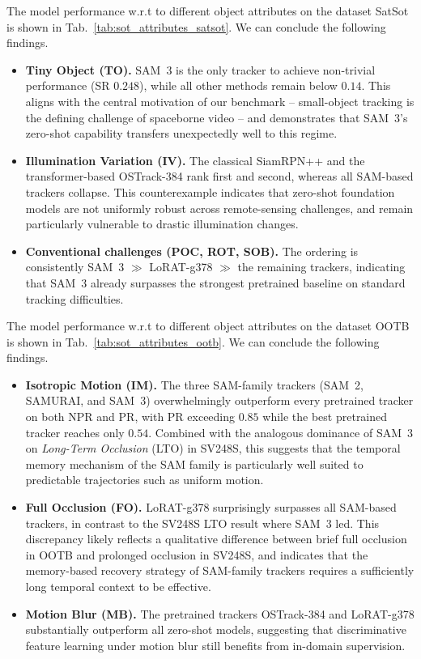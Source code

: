 \documentclass{article}
\begin{document}

The model performance w.r.t to different object attributes on the dataset SatSot
is shown in Tab.~\ref{tab:sot_attributes_satsot}. We can conclude the following
findings.
\begin{itemize}
    \item \textbf{Tiny Object (TO).} SAM~3 is the only tracker to achieve
    non-trivial performance (SR $0.248$), while all other methods remain
    below $0.14$. This aligns with the central motivation of our benchmark
    -- small-object tracking is the defining challenge of spaceborne
    video -- and demonstrates that SAM~3's zero-shot capability transfers
    unexpectedly well to this regime.
    \item \textbf{Illumination Variation (IV).} The classical
    SiamRPN++ and the transformer-based OSTrack-384 rank first and second,
    whereas all SAM-based trackers collapse. This counterexample indicates
    that zero-shot foundation models are not uniformly robust across
    remote-sensing challenges, and remain particularly vulnerable to
    drastic illumination changes.
    \item \textbf{Conventional challenges (POC, ROT, SOB).} The ordering
    is consistently SAM~3 $\gg$ LoRAT-g378 $\gg$ the remaining trackers,
    indicating that SAM~3 already surpasses the strongest pretrained
    baseline on standard tracking difficulties.
\end{itemize}
 
The model performance w.r.t to different object attributes on the dataset OOTB
is shown in Tab.~\ref{tab:sot_attributes_ootb}. We can conclude the following
findings.
\begin{itemize}
    \item \textbf{Isotropic Motion (IM).} The three SAM-family trackers
    (SAM~2, SAMURAI, and SAM~3) overwhelmingly outperform every pretrained
    tracker on both NPR and PR, with PR exceeding $0.85$ while the best
    pretrained tracker reaches only $0.54$. Combined with the analogous
    dominance of SAM~3 on \emph{Long-Term Occlusion} (LTO) in SV248S,
    this suggests that the temporal memory mechanism of the SAM family
    is particularly well suited to predictable trajectories such as
    uniform motion.
    \item \textbf{Full Occlusion (FO).} LoRAT-g378 surprisingly
    surpasses all SAM-based trackers, in contrast to the SV248S LTO
    result where SAM~3 led. This discrepancy likely reflects a
    qualitative difference between brief full occlusion in OOTB and
    prolonged occlusion in SV248S, and indicates that the memory-based
    recovery strategy of SAM-family trackers requires a sufficiently
    long temporal context to be effective.
    \item \textbf{Motion Blur (MB).} The pretrained trackers
    OSTrack-384 and LoRAT-g378 substantially outperform all zero-shot
    models, suggesting that discriminative feature learning under
    motion blur still benefits from in-domain supervision.
\end{itemize}
  



\clearpage

\end{document}
